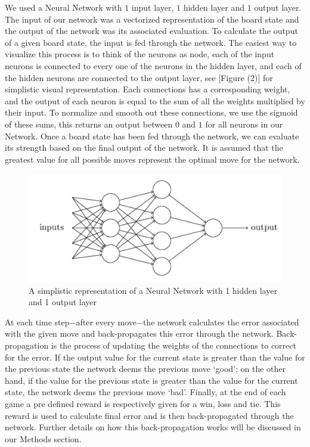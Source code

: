 \documentclass{sig-alternate-05-2015}
\begin{document}
We used a Neural Network with $1$ input layer, $1$ hidden layer and $1$ output layer. The input of our network was a vectorized representation of the board state and the output of the network was its associated evaluation. To calculate the output of a given board state, the input is fed through the network. The easiest way to visualize this process is to think of the neurons as node, each of the input neurons is connected to every one of the neurons in the hidden layer, and each of the hidden neurons are connected to the output layer, see [Figure (2)] for simplistic visual representation. Each connections has a corresponding weight, and the output of each neuron is equal to the sum of all the weights multiplied by their input. To normalize and smooth out these connections, we use the sigmoid of these sums, this returns an output between $0$ and $1$ for all neurons in our Network. Once a board state has been fed through the network, we can evaluate its strength based on the final output of the network. It is assumed that the greatest value for all possible moves represent the optimal move for the network.

\begin{figure}[h!]
  \includegraphics[width=\linewidth]{simpleNN.png}
  \caption{A simplistic representation of a Neural Network with 1 hidden layer and 1 output layer}
  \label{fig:simpleNN2}
\end{figure}

At each time step$-$after every move$-$the network calculates the error associated with the given move and back-propagates this error through the network. Back-propagation is the process of updating the weights of the connections to correct for the error. If the output value for the current state is greater than the value for the previous state the network deems the previous move `good'; on the other hand, if the value for the previous state is greater than the value for the current state, the network deems the previous move `bad'. Finally, at the end of each game a pre defined reward is respectively given for a win, loss and tie. This reward is used to calculate final error and is then back-propagated through the network. Further details on how this back-propagation works will be discussed in our Methods section. 
\end{document}
